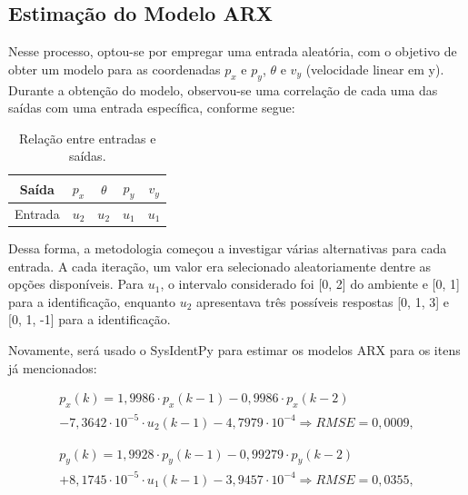 \documentclass[12pt,           %
a4paper,                       %
openany,                       %
oneside,                       %
chapter=TITLE,                 %
english,                       %
spanish,                       %
brazil,                        %
sumario=tradicional]{abntex2}  %
\begin{document}
\begin{OnehalfSpace}
\subsection{Estimação do Modelo ARX}
\label{subsec:GPCforLL}  

Nesse processo, optou-se por empregar uma entrada aleatória, com o objetivo de obter um modelo para as coordenadas $p_x$ e $p_y$, $\theta$ e $v_y$ (velocidade linear em y). Durante a obtenção do modelo, observou-se uma correlação de cada uma das saídas com uma entrada específica, conforme segue:

\begin{table}[H]
	\centering
	\vspace*{-.2cm}
	\caption{Relação entre entradas e saídas.}
	\begin{tabular}{|c|c|c|c|c|}
            \hline
            Saída & $p_x$ & $\theta$ & $p_y$ & $v_y$ \\
            \hline
            Entrada & $u_2$ & $u_2$ & $u_1$ & $u_1$\\ 
            \hline
	\end{tabular}  
    \label{tab:intcartpole}                 %
\end{table}
\vspace*{-0.7cm}
{\raggedright {}}

Dessa forma, a metodologia começou a investigar várias alternativas para cada entrada. A cada iteração, um valor era selecionado aleatoriamente dentre as opções disponíveis. Para $u_1$, o intervalo considerado foi [0, 2] do ambiente e [0, 1] para a identificação, enquanto $u_2$ apresentava três possíveis respostas [0, 1, 3] e [0, 1, -1] para a identificação.

 Novamente, será usado o SysIdentPy para estimar os modelos ARX para os itens já mencionados:

\begin{equation}
\begin{matrix}
    p_x(k) = 1,9986\cdot p_x(k-1) -0,9986 \cdot p_x(k-2)\\
    -7,3642\cdot 10^{-5}\cdot u_2(k-1) -4,7979\cdot 10^{-4}\Rightarrow RMSE=0,0009,
\end{matrix} 
\end{equation}

\begin{equation}
\begin{matrix}
    p_y(k) = 1,9928\cdot p_y(k-1) - 0,99279\cdot p_y(k-2)\\
    +8,1745\cdot 10^{-5}\cdot u_1(k-1) -3,9457\cdot 10^{-4}\Rightarrow RMSE=0,0355,
\end{matrix} 
\end{equation}


\end{OnehalfSpace}
\end{document}
